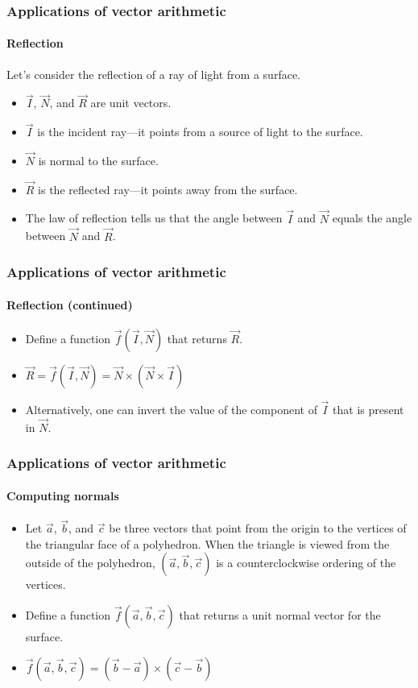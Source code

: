 \documentclass[xcolor=dvipsnames]{beamer}
\begin{document}
\begin{frame}
\frametitle{Applications of vector arithmetic}
\framesubtitle{Reflection}

  Let's consider the reflection of a ray of light
  from a surface.
  \begin{itemize}
    \item $\vec{I}$, $\vec{N}$, and $\vec{R}$ are unit vectors.
    \item $\vec{I}$ is the incident ray---it points from a 
      source of light to the surface.
    \item $\vec{N}$ is normal to the surface.
    \item $\vec{R}$ is the reflected ray---it points away from the
      surface.
    \item The law of reflection tells us that the angle between
      $\vec{I}$ and $\vec{N}$ equals the angle between
      $\vec{N}$ and $\vec{R}$.
    \end{itemize}

  \end{frame}

\begin{frame}
\frametitle{Applications of vector arithmetic}
\framesubtitle{Reflection (continued)}

  \begin{itemize}
  \item Define a function $\vec{f}(\vec{I},\vec{N})$ that returns $\vec{R}$.
  \item $\vec{R} = \vec{f}(\vec{I},\vec{N}) = \vec{N} \times (\vec{N} \times \vec{I})$
  \item Alternatively, one can invert the value of the component of $\vec{I}$ that is present in $\vec{N}$.
  \end{itemize}

  \end{frame}

\begin{frame}
\frametitle{Applications of vector arithmetic}
\framesubtitle{Computing normals}

  \begin{itemize}
    \item Let $\vec{a}$, $\vec{b}$, and $\vec{c}$ be three
      vectors that point from the origin to the vertices
      of the triangular face of a polyhedron.
      When the triangle is viewed from the outside
      of the polyhedron, $(\vec{a}, \vec{b}, \vec{c})$ 
      is a counterclockwise ordering of the vertices.

    \item Define a function $\vec{f}(\vec{a}, \vec{b}, \vec{c})$
      that returns a unit normal vector for the surface.

    \item $\vec{f}(\vec{a}, \vec{b}, \vec{c}) = (\vec{b}-\vec{a}) \times (\vec{c}-\vec{b})$
    \end{itemize}

  \end{frame}
\end{document}
